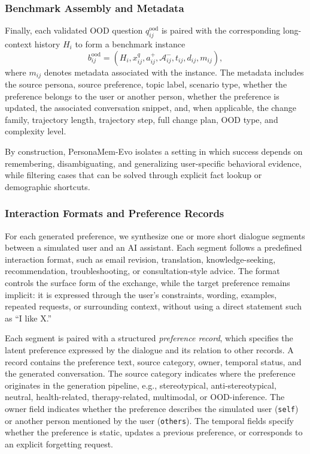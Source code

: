 \documentclass{article}
\begin{document}
\subsubsection{Benchmark Assembly and Metadata}
\label{app:persona_metadata}
Finally, each validated OOD question $q_{ij}^{\mathrm{ood}}$ is paired with the corresponding long-context history $H_i$ to form a benchmark instance
\[
b_{ij}^{\mathrm{ood}}
=
\left(
H_i,
x_{ij}^{q},
a_{ij}^{+},
\mathcal{A}_{ij}^{-},
t_{ij},
d_{ij},
m_{ij}
\right),
\]
where $m_{ij}$ denotes metadata associated with the instance. The metadata includes the source persona, source preference, topic label, scenario type, whether the preference belongs to the user or another person, whether the preference is updated, the associated conversation snippet, and, when applicable, the change family, trajectory length, trajectory step, full change plan, OOD type, and complexity level.

By construction, PersonaMem-Evo isolates a setting in which success depends on remembering, disambiguating, and generalizing user-specific behavioral evidence, while filtering cases that can be solved through explicit fact lookup or demographic shortcuts.








\subsubsection{Interaction Formats and Preference Records}
\label{app:persona_inter_format}

For each generated preference, we synthesize one or more short dialogue segments between a simulated user and an AI assistant. Each segment follows a predefined interaction format, such as email revision, translation, knowledge-seeking, recommendation, troubleshooting, or consultation-style advice. The format controls the surface form of the exchange, while the target preference remains implicit: it is expressed through the user's constraints, wording, examples, repeated requests, or surrounding context, without using a direct statement such as ``I like X.''

Each segment is paired with a structured \emph{preference record}, which specifies the latent preference expressed by the dialogue and its relation to other records. A record contains the preference text, source category, owner, temporal status, and the generated conversation. The source category indicates where the preference originates in the generation pipeline, e.g., stereotypical, anti-stereotypical, neutral, health-related, therapy-related, multimodal, or OOD-inference. The owner field indicates whether the preference describes the simulated user (\texttt{self}) or another person mentioned by the user (\texttt{others}). The temporal fields specify whether the preference is static, updates a previous preference, or corresponds to an explicit forgetting request.
\end{document}
